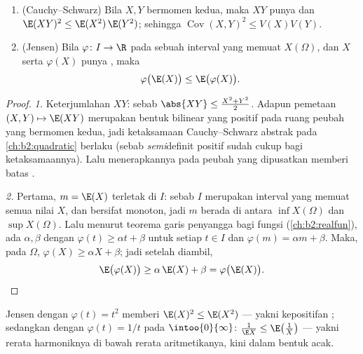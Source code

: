 \begin{theorem}\label{thm:b2:randomvar:jensen}
\leavevmode
\begin{enumerate}
\item (Cauchy--Schwarz) Bila $X, Y$ bermomen kedua, maka $XY$ punya
 dan $\E(XY)^2 \leq \E(X^2)\,\E(Y^2)$; sehingga
$\operatorname{Cov}(X,Y)^2 \leq V(X)V(Y)$.
\item (Jensen) Bila $\varphi \colon I \to \R$  pada sebuah
interval yang memuat $X(\Omega)$, dan $X$ serta $\varphi(X)$ punya
, maka
\[
\varphi\bigl(\E(X)\bigr) \leq \E\bigl(\varphi(X)\bigr) .
\]
\end{enumerate}
\end{theorem}

\begin{proof}
\emph{1.} Keterjumlahan $XY$: sebab $\abs{XY} \leq \frac{X^2 + Y^2}2$.
Adapun pemetaan $(X, Y) \mapsto \E(XY)$ merupakan bentuk bilinear  yang
positif pada ruang peubah yang bermomen kedua, jadi ketaksamaan
Cauchy--Schwarz abstrak pada \cref{ch:b2:quadratic} berlaku
(sebab \emph{semi}definit positif sudah cukup bagi ketaksamaannya).
Lalu menerapkannya pada peubah yang dipusatkan memberi batas .

\emph{2.} Pertama, $m = \E(X)$ terletak di $I$: sebab $I$ merupakan interval
yang memuat semua nilai $X$, dan  bersifat monoton, jadi $m$
berada di antara $\inf X(\Omega)$ dan $\sup X(\Omega)$. Lalu menurut
teorema garis penyangga bagi fungsi 
(\cref{ch:b2:realfun}), ada $\alpha, \beta$ dengan
$\varphi(t) \geq \alpha t + \beta$ untuk setiap $t \in I$ dan
$\varphi(m) = \alpha m + \beta$. Maka,  pada $\Omega$,
$\varphi(X) \geq \alpha X + \beta$; jadi setelah  diambil,
\[
\E\bigl(\varphi(X)\bigr) \geq \alpha\,\E(X) + \beta
= \varphi\bigl(\E(X)\bigr). \qedhere
\]
\end{proof}

\begin{example}
Jensen dengan $\varphi(t) = t^2$ memberi $\E(X)^2 \leq \E(X^2)$ ---
yakni kepositifan ; sedangkan dengan $\varphi(t) = 1/t$ pada
$\intoo{0}{\infty}$: $\frac{1}{\E X} \leq \E\bigl(\frac1X\bigr)$
--- yakni rerata harmoniknya di bawah rerata aritmetikanya, kini dalam bentuk
acak.
\end{example}

